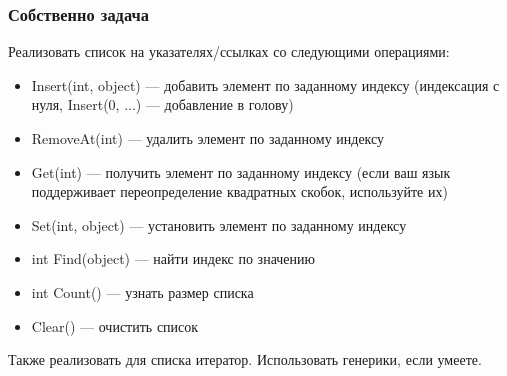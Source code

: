 \documentclass{../../slides-style}
\begin{document}
    \begin{frame}
        \frametitle{Собственно задача}
        Реализовать список на указателях/ссылках со следующими операциями:
        \begin{itemize}
            \item Insert(int, object) --- добавить элемент по заданному индексу (индексация с нуля, Insert(0, ...) --- добавление в голову)
            \item RemoveAt(int) --- удалить элемент по заданному индексу
            \item Get(int) --- получить элемент по заданному индексу (если ваш язык поддерживает переопределение квадратных скобок, используйте их)
            \item Set(int, object) --- установить элемент по заданному индексу
            \item int Find(object) --- найти индекс по значению
            \item int Count() --- узнать размер списка
            \item Clear() --- очистить список
        \end{itemize}
        Также реализовать для списка итератор. Использовать генерики, если умеете.
    \end{frame}
\end{document}
